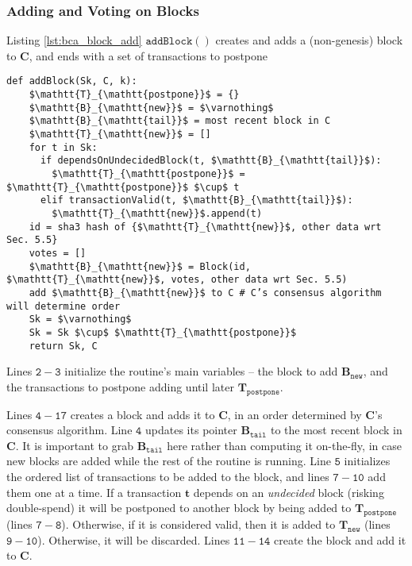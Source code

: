 \subsubsection{Adding and Voting on Blocks}

\medskip
Listing \ref{lst:bca_block_add} $\mathtt{addBlock()}$ creates and adds a (non-genesis) block to $\mathbf{C}$, and ends with a set of transactions to postpone

\begin{minipage}{\linewidth}
  \begin{lstlisting}[caption={Routine for adding normal blocks.}, label={lst:bca_block_add}, style=python, mathescape=true]
  def addBlock(Sk, C, k):
    $\mathtt{T}_{\mathtt{postpone}}$ = {}
    $\mathtt{B}_{\mathtt{new}}$ = $\varnothing$
    $\mathtt{B}_{\mathtt{tail}}$ = most recent block in C
    $\mathtt{T}_{\mathtt{new}}$ = []
    for t in Sk:
      if dependsOnUndecidedBlock(t, $\mathtt{B}_{\mathtt{tail}}$):
        $\mathtt{T}_{\mathtt{postpone}}$ = $\mathtt{T}_{\mathtt{postpone}}$ $\cup$ t
      elif transactionValid(t, $\mathtt{B}_{\mathtt{tail}}$):
        $\mathtt{T}_{\mathtt{new}}$.append(t)
    id = sha3 hash of {$\mathtt{T}_{\mathtt{new}}$, other data wrt Sec. 5.5}
    votes = []
    $\mathtt{B}_{\mathtt{new}}$ = Block(id, $\mathtt{T}_{\mathtt{new}}$, votes, other data wrt Sec. 5.5)
    add $\mathtt{B}_{\mathtt{new}}$ to C # C’s consensus algorithm will determine order
    Sk = $\varnothing$
    Sk = Sk $\cup$ $\mathtt{T}_{\mathtt{postpone}}$
    return Sk, C
  \end{lstlisting}
\end{minipage}

Lines $\mathtt{2-3}$ initialize the routine’s main variables – the block to add $\mathbf{B}_{\mathtt{new}}$, and the transactions to postpone adding until later $\mathbf{T}_{\mathtt{postpone}}$.

Lines $\mathtt{4-17}$ creates a block and adds it to $\mathbf{C}$, in an order determined by $\mathbf{C}$’s consensus algorithm.
Line $\mathtt{4}$ updates its pointer $\mathbf{B}_{\mathtt{tail}}$ to the most recent block in $\mathbf{C}$.
It is important to grab $\mathbf{B}_{\mathtt{tail}}$ here rather than computing it on-the-fly, in case new blocks are added while the rest of the routine is running.
Line $\mathtt{5}$ initializes the ordered list of transactions to be added to the block, and lines $\mathtt{7-10}$ add them one at a time.
If a transaction $\mathbf{t}$ depends on an \textsf{\textit{undecided}} block (risking double-spend) it will be postponed to another block by being added to $\mathbf{T}_{\mathtt{postpone}}$ (lines $\mathtt{7-8}$).
Otherwise, if it is considered valid, then it is added to $\mathbf{T}_{\mathtt{new}}$ (lines $\mathtt{9-10}$).
Otherwise, it will be discarded. Lines $\mathtt{11-14}$ create the block and add it to $\mathbf{C}$.

